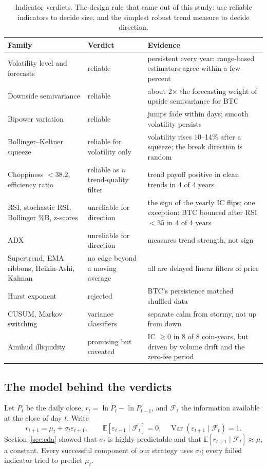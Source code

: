 \documentclass[11pt,a4paper]{article}
\theoremstyle{definition}
\begin{document}
\begin{table}[htbp]\centering\small
\begin{tabularx}{\linewidth}{@{}p{42mm}p{33mm}L@{}}
\toprule
\textbf{Family} & \textbf{Verdict} & \textbf{Evidence}\\
\midrule
Volatility level and forecasts & reliable & persistent every year; range-based estimators agree within a few percent\\
Downside semivariance & reliable & about 2$\times$ the forecasting weight of upside semivariance for BTC\\
Bipower variation & reliable & jumps fade within days; smooth volatility persists\\
Bollinger--Keltner squeeze & reliable for volatility only & volatility rises 10--14\% after a squeeze; the break direction is random\\
Choppiness $<38.2$, efficiency ratio & reliable as a trend-quality filter & trend payoff positive in clean trends in 4 of 4 years\\
RSI, stochastic RSI, Bollinger \%B, z-scores & unreliable for direction & the sign of the yearly IC flips; one exception: BTC bounced after RSI $<35$ in 4 of 4 years\\
ADX & unreliable for direction & measures trend strength, not sign\\
Supertrend, EMA ribbons, Heikin-Ashi, Kalman & no edge beyond a moving average & all are delayed linear filters of price\\
Hurst exponent & rejected & BTC's persistence matched shuffled data\\
CUSUM, Markov switching & variance classifiers & separate calm from stormy, not up from down\\
Amihud illiquidity & promising but caveated & IC $\ge0$ in 8 of 8 coin-years, but driven by volume drift and the zero-fee period\\
\bottomrule
\end{tabularx}
\caption{Indicator verdicts. The design rule that came out of this study: use reliable indicators to decide size, and the simplest robust trend measure to decide direction.}
\end{table}

\subsection{The model behind the verdicts}
Let $P_t$ be the daily close, $r_t=\ln P_t-\ln P_{t-1}$, and $\mathcal F_t$ the information available at the close of day $t$. Write
\begin{equation}
r_{t+1}=\mu_t+\sigma_t\varepsilon_{t+1},\qquad\mathbb E[\varepsilon_{t+1}\mid\mathcal F_t]=0,\quad\operatorname{Var}(\varepsilon_{t+1}\mid\mathcal F_t)=1.
\end{equation}
Section~\ref{sec:eda} showed that $\sigma_t$ is highly predictable and that $\mathbb E[r_{t+1}\mid\mathcal F_t]\approx\mu$, a constant. Every successful component of our strategy uses $\sigma_t$; every failed indicator tried to predict $\mu_t$.
\end{document}
